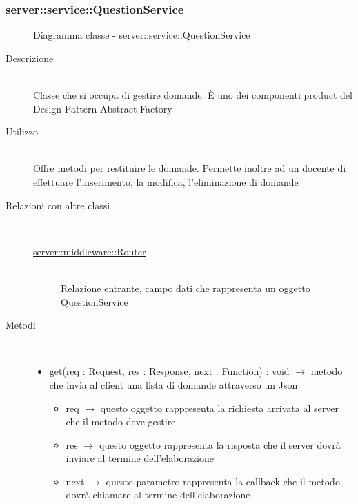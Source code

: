 \subsubsection[QuestionService]{server::service::QuestionService}
\begin{figure}[H]
	\centering
	\caption{Diagramma classe - server::service::QuestionService}
\end{figure}\begin{description}
\item[Descrizione] \hfill \\
Classe che si occupa di gestire domande. È uno dei componenti product del Design Pattern Abstract Factory
\item[Utilizzo] \hfill \\
Offre metodi per restituire le domande. Permette inoltre ad un docente di effettuare l'inserimento, la modifica, l'eliminazione di domande
\item[Relazioni con altre classi] \hfill \\
\vspace{-7mm}
\begin{description}
	\item[\hyperlink{server::middleware::Router}{server::middleware::Router}] \hfill \\
	Relazione entrante, campo dati che rappresenta un oggetto QuestionService
\end{description}

\item[Metodi] \hfill \\
\vspace{-7mm}
\begin{itemize}
	\item get(req : Request, res : Response, next : Function) : void $\rightarrow$ metodo che invia al client una lista di domande attraverso un Json\begin{itemize}
		\item req $\rightarrow$ questo oggetto rappresenta la richiesta arrivata al server che il metodo deve gestire
		\item res $\rightarrow$ questo oggetto rappresenta la risposta che il server dovrà inviare al termine dell'elaborazione
		\item next $\rightarrow$ questo parametro rappresenta la callback che il metodo dovrà chiamare al termine dell’elaborazione
	\end{itemize}
	

\end{itemize}
\end{description}
